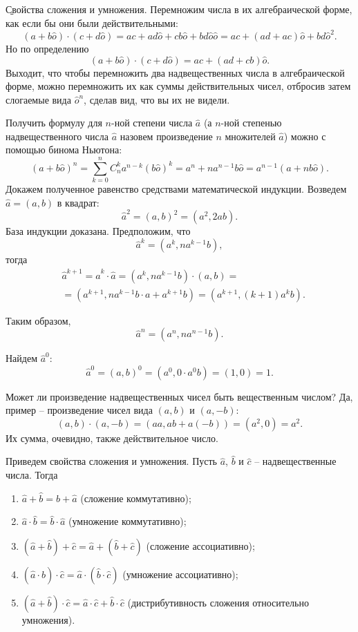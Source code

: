 \b{Свойства сложения и умножения.} Перемножим числа в их алгебраической форме, как если бы они были действительными:
	$$(a+b\hat{o})\cdot(c+d\hat{o})=ac+ad\hat{o}+cb\hat{o}+bd\hat{o}\hat{o}=ac+(ad+ac)\hat{o}+bd\hat{o}^2.$$
Но по определению
	$$(a+b\hat{o})\cdot(c+d\hat{o})=ac+(ad+cb)\hat{o}.$$
Выходит, что чтобы перемножить два надвещественных числа в алгебраической форме, можно перемножить их как суммы действительных чисел, отбросив затем слогаемые вида $\hat{o}^n$, сделав вид, что вы их не видели. 
\begin{example} Получить формулу для $n$-ной степени числа $\hat{a}$  (а $n$-ной степенью надвещественного числа $\hat{a}$ назовем произведение $n$ множителей $\hat{a}$) можно с помощью бинома Ньютона:
	$$(a+b\hat{o})^n=\sum_{k=0}^n C_n^k a^{n-k} (b\hat{o})^k=a^n+na^{n-1}b\hat{o}=a^{n-1}(a+nb\hat{o}).$$
Докажем полученное равенство средствами математической индукции. Возведем $\hat{a}=(a, b)$ в квадрат:
	$$\hat{a}^2=(a, b)^2=(a^2, 2ab).$$
База индукции доказана. Предположим, что
	$$\hat{a}^k=(a^k, na^{k-1}b),$$
тогда
	\begin{eqnarray*}
	& \hat{a}^{k+1}=\hat{a}^k\cdot\hat{a}=(a^k, na^{k-1}b)\cdot(a, b)= \\
	& = (a^{k+1}, na^{k-1}b\cdot a+a^{k+1}b)=(a^{k+1}, (k+1)a^kb).
	\end{eqnarray*}
\end{example}
Таким образом,
\begin{equation}\label{eq:npower}
	\hat{a}^n=(a^n, na^{n-1}b).
\end{equation}
\begin{example}
	Найдем $\hat{a}^0$:
		$$\hat{a}^0=(a, b)^0=(a^0, 0\cdot a^0b)=(1, 0)=1.$$
\end{example}
\begin{example} Может ли произведение надвещественных чисел быть вещественным числом? Да, пример -- произведение чисел вида $(a, b)$ и $(a, -b)$:
	$$(a, b)\cdot(a, -b)=(aa, ab+a(-b))=(a^2, 0)=a^2.$$
Их сумма, очевидно, также действительное число.
\end{example}
Приведем свойства сложения и умножения. Пусть $\hat{a}$, $\hat{b}$ и $\hat{c}$ -- надвещественные числа. Тогда
\begin{enumerate}
	\item $\hat{a}+\hat{b}=\hat{b}+\hat{a}$ (сложение коммутативно); 
	\item $\hat{a}\cdot\hat{b}=\hat{b}\cdot\hat{a}$ (умножение коммутативно); 
	\item $(\hat{a}+\hat{b})+\hat{c}=\hat{a}+(\hat{b}+\hat{c})$ (сложение ассоциативно); 
	\item $(\hat{a}\cdot\hat{b})\cdot\hat{c}=\hat{a}\cdot(\hat{b}\cdot\hat{c})$ (умножение ассоциативно);
	\item $(\hat{a}+\hat{b})\cdot\hat{c}=\hat{a}\cdot\hat{c}+\hat{b}\cdot\hat{c}$ (дистрибутивность сложения относительно умножения).
\end{enumerate}
